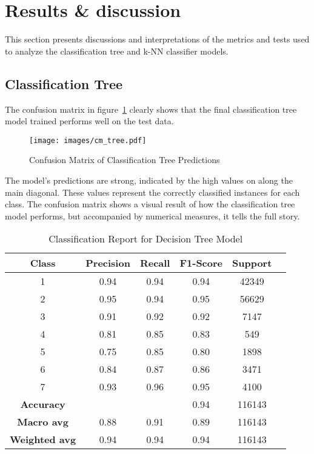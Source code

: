 \documentclass[conference]{IEEEtran}
\begin{document}
\section{\textbf{Results \& discussion}}

This section presents discussions and interpretations of the metrics and tests used to analyze the classification tree and k-NN classifier models.

\subsection{\textbf{Classification Tree}}

The confusion matrix in figure~\ref{fig:cm_tree} clearly shows that the final classification tree model trained performs well on the test data.

\begin{figure}[H]
    \centering
    \texttt{[image: images/cm\_tree.pdf]}
    \caption{Confusion Matrix of Classification Tree Predictions}
    \label{fig:cm_tree}
\end{figure}

The model's predictions are strong, indicated by the high values on along the main diagonal. These values represent the correctly classified instances for each class. The confusion matrix shows a visual result of how the classification tree model performs, but accompanied by numerical measures, it tells the full story.

\begin{table}[H]
    \centering
    \caption{Classification Report for Decision Tree Model}
    \label{tab:class_rep_tree}
    \begin{tabular}{cccccc}
        \toprule
        \textbf{Class} & \textbf{Precision} & \textbf{Recall} & \textbf{F1-Score} & \textbf{Support} \\
        \midrule
        1 & 0.94 & 0.94 & 0.94 & 42349 \\
        2 & 0.95 & 0.94 & 0.95 & 56629 \\
        3 & 0.91 & 0.92 & 0.92 & 7147 \\
        4 & 0.81 & 0.85 & 0.83 & 549 \\
        5 & 0.75 & 0.85 & 0.80 & 1898 \\
        6 & 0.84 & 0.87 & 0.86 & 3471 \\
        7 & 0.93 & 0.96 & 0.95 & 4100 \\
        \midrule
        \textbf{Accuracy} &  &  & 0.94 & 116143 \\
        \textbf{Macro avg} & 0.88 & 0.91 & 0.89 & 116143 \\
        \textbf{Weighted avg} & 0.94 & 0.94 & 0.94 & 116143 \\
        \bottomrule
    \end{tabular}
\end{table}
\end{document}
